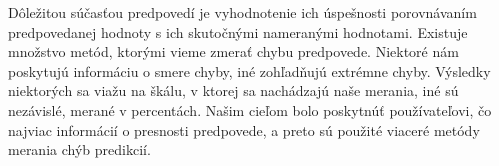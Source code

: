 \documentclass[a4paper,slovak,12pt,appendix]{article}
\begin{document}
Dôležitou súčasťou predpovedí je vyhodnotenie ich úspešnosti porovnávaním
predpovedanej hodnoty s ich skutočnými nameranými hodnotami. Existuje množstvo
metód, ktorými vieme zmerať chybu predpovede. Niektoré nám poskytujú informáciu
o smere chyby, iné zohľadňujú extrémne chyby. Výsledky niektorých sa viažu na
škálu, v ktorej sa nachádzajú naše merania, iné sú nezávislé, merané v
percentách. Našim cieľom bolo poskytnúť používateľovi, čo najviac informácií
o presnosti predpovede, a preto sú použité viaceré metódy merania chýb
predikcií.

%
%
%
%
%
%
%
%
%
%
%
\end{document}
